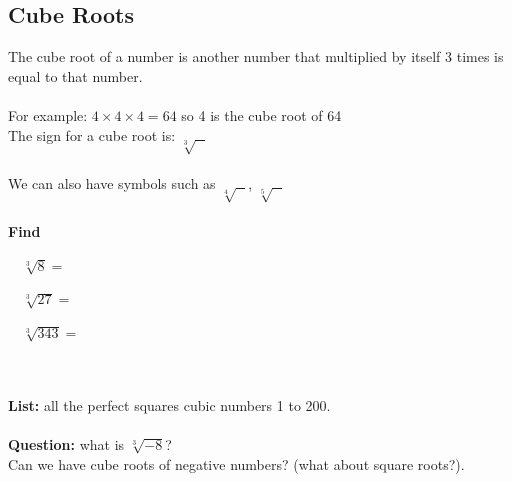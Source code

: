 \documentclass[a4paper,12pt]{article}
\begin{document}
\subsection{Cube Roots}
The cube root of a number is another number that multiplied by itself 3 times is equal to that number.\\\\
For example:    $4\times4\times4=64$         so 4 is the cube root of 64\\
The sign for a cube root is: $\sqrt[3]{~~~}$\\\\
We can also have symbols such as $\sqrt[4]{~~~}$, $\sqrt[5]{~~~}$\\\\
\textbf{Find}
\begin{enumerate*}
	\item ~~$\sqrt[3]{8}=$~~~~~~~~~~~~~~~
	\item ~~$\sqrt[3]{27}=$~~~~~~~~~~~~~~~
	\item ~~$\sqrt[3]{343}=$~~~~~~~~~~~~~~~
\end{enumerate*}\\\\
\textbf{List:} all the perfect squares cubic numbers 1 to 200.\\\\
\textbf{Question:} what is $\sqrt[3]{-8}$? \\
Can we have cube roots of negative numbers? (what about square roots?).
\newpage
\end{document}
